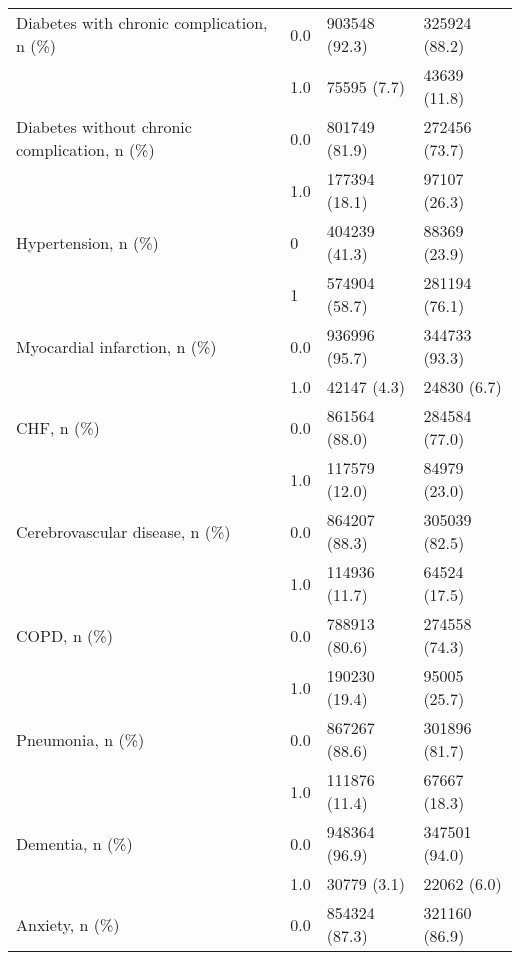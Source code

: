 \begin{tabular}{llll}
Diabetes with chronic complication, n (\%) & 0.0 &                         903548 (92.3) &     325924 (88.2) \\
                                       & 1.0 &                           75595 (7.7) &      43639 (11.8) \\
Diabetes without chronic complication, n (\%) & 0.0 &                         801749 (81.9) &     272456 (73.7) \\
                                       & 1.0 &                         177394 (18.1) &      97107 (26.3) \\
Hypertension, n (\%) & 0 &                         404239 (41.3) &      88369 (23.9) \\
                                       & 1 &                         574904 (58.7) &     281194 (76.1) \\
Myocardial infarction, n (\%) & 0.0 &                         936996 (95.7) &     344733 (93.3) \\
                                       & 1.0 &                           42147 (4.3) &       24830 (6.7) \\
CHF, n (\%) & 0.0 &                         861564 (88.0) &     284584 (77.0) \\
                                       & 1.0 &                         117579 (12.0) &      84979 (23.0) \\
Cerebrovascular disease, n (\%) & 0.0 &                         864207 (88.3) &     305039 (82.5) \\
                                       & 1.0 &                         114936 (11.7) &      64524 (17.5) \\
COPD, n (\%) & 0.0 &                         788913 (80.6) &     274558 (74.3) \\
                                       & 1.0 &                         190230 (19.4) &      95005 (25.7) \\
Pneumonia, n (\%) & 0.0 &                         867267 (88.6) &     301896 (81.7) \\
                                       & 1.0 &                         111876 (11.4) &      67667 (18.3) \\
Dementia, n (\%) & 0.0 &                         948364 (96.9) &     347501 (94.0) \\
                                       & 1.0 &                           30779 (3.1) &       22062 (6.0) \\
Anxiety, n (\%) & 0.0 &                         854324 (87.3) &     321160 (86.9) \\

\end{tabular}
